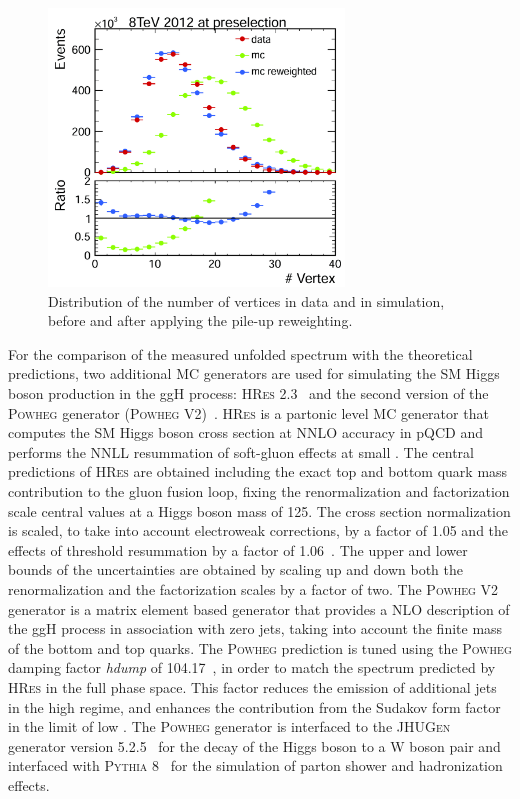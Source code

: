 \begin{figure}[htb]
\centering
\includegraphics[width=0.7\textwidth]{images/nvertex.pdf}
\caption{Distribution of the number of vertices in data and in simulation, before and after applying the pile-up reweighting.}\label{fig:nvertex}
\end{figure}

For the comparison of the measured unfolded spectrum with the theoretical predictions, two additional MC generators are used for simulating the SM Higgs boson production in the ggH process: \textsc{HRes} 2.3~\cite{deFlorian:2012mx,Grazzini:2013mca} and the second version of the \textsc{Powheg} generator (\textsc{Powheg V2})~\cite{Bagnaschi:2011tu}.
\textsc{HRes} is a partonic level MC generator that computes the SM Higgs
boson cross section at NNLO accuracy in pQCD and performs the NNLL
resummation of soft-gluon effects at small \pt. The central predictions of
\textsc{HRes} are obtained including the exact top and bottom quark mass contribution to
the gluon fusion loop, fixing the renormalization and factorization scale central values at a Higgs boson mass of 125\GeV. The cross section normalization is scaled, to take into account electroweak corrections, by a factor of 1.05 and the effects of threshold resummation by a factor of 1.06~\cite{Actis:2008ug,Catani:2003zt}. The upper and lower bounds of the uncertainties are obtained by scaling up and down both the renormalization and the factorization scales by a factor of two.
The \textsc{Powheg V2} generator is a matrix element based generator that provides a NLO description of the ggH process in association with zero jets, taking into account the finite mass of the bottom and top quarks.
The \textsc{Powheg} prediction is tuned using the \textsc{Powheg} damping factor \textit{hdump} of 104.17~\GeV, in order to match the \pth{} spectrum predicted by \textsc{HRes} in the full phase space. This factor reduces the emission of additional jets in the high \pt regime, and enhances the contribution from the Sudakov form factor in the limit of low \pt.
The \textsc{Powheg} generator is interfaced to the \textsc{JHUGen} generator version 5.2.5~\cite{Gao:2010qx,Bolognesi:2012mm,Anderson:2013afp} for the decay of the Higgs boson to a W boson pair and interfaced with \textsc{Pythia 8}~\cite{Sjostrand:2007gs} for the simulation of parton shower and hadronization effects.
